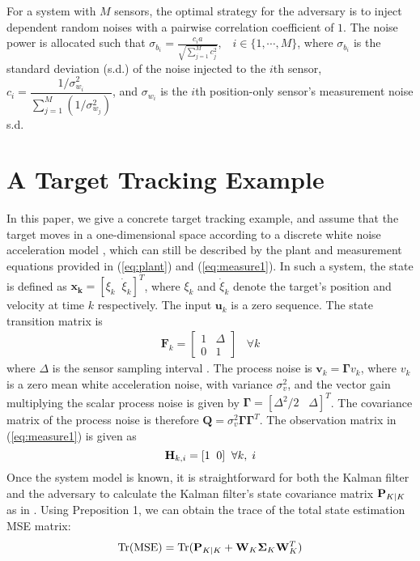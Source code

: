 \documentclass{article}
\begin{document}
\begin{proposition}
\label{pro:attack}
	For a system with $M$ sensors, the optimal strategy for the adversary is to inject dependent random noises with a pairwise correlation coefficient of $1$. The noise  power is allocated such that $\sigma_{b_i}=\frac{c_{i}a}{\sqrt{ \sum_{j=1}^M c^2_{j} }}, \;\;\;  i\in \{1,\cdots,M\}$, where $\sigma_{b_i}$ is the standard deviation (s.d.) of the noise injected to the $i$th sensor,  $
	c_{i}=\dfrac{1/{\sigma^2_{w_i}}}{\sum_{j=1}^M  \left(1/{\sigma^2_{w_j}}\right)}$, and $\sigma_{w_i}$ is the $i$th position-only sensor's measurement noise s.d. 
\end{proposition}
\section{A Target Tracking Example }

In this paper, we give a concrete target tracking example, and assume that the target moves in a one-dimensional space according to a discrete white noise acceleration model \cite{YBS:book}, which can still be described by the plant and measurement equations provided in (\ref{eq:plant}) and (\ref{eq:measure1}). 
In such a system, the state is defined as $\mathbf{x_k}=[\xi_k \;\; \dot{\xi}_k]^T$, where $\xi_k$ and $\dot{\xi}_k$ denote the target's position and velocity at time $k$ respectively.  The input $\mathbf{u}_k$ is a zero sequence. 
The state transition matrix is 
\begin{eqnarray}
\mathbf{F}_k=\left[\begin{array}{cc}
1 &\Delta\\
0 &1 	
\end{array}\right] \;\;\;\forall k
\label{eq:F}
\end{eqnarray}
where $\Delta$ is the sensor sampling  interval . The process noise is $\mathbf{v}_k=\mathbf{\Gamma} v_k$, where $v_k$ is a zero mean white acceleration noise, with variance $\sigma_{v}^{2}$, and the vector gain multiplying the scalar process noise is given by $ \mathbf{\Gamma} = \left[	\Delta^{2}/2\;\;\;  	\Delta \right]^T$.
The covariance matrix of the process noise is therefore $ \mathbf{Q}=\sigma^{2}_{v} \mathbf{\Gamma}  \mathbf{\Gamma}^T$. 
The observation matrix in (\ref{eq:measure1}) is given as 
\begin{equation}
	{\bf H}_{k,i}=[1 \;\; 0]\;\;\forall k, \; i
\end{equation} 
Once the system model is known, it is straightforward for both the Kalman filter and the adversary to calculate the Kalman filter's state  covariance matrix ${\bf P}_{K|K}$ as in \cite{YBS:book}. Using Preposition 1, we can obtain the trace of the total state estimation MSE matrix:
\begin{equation}
	\textrm{Tr}(\textrm{MSE})=\textrm{Tr}({\bf P}_{K|K}+{\bf W}_K\boldsymbol{\Sigma}_K{\bf W}_K^{T})
\end{equation} 
\end{document}
